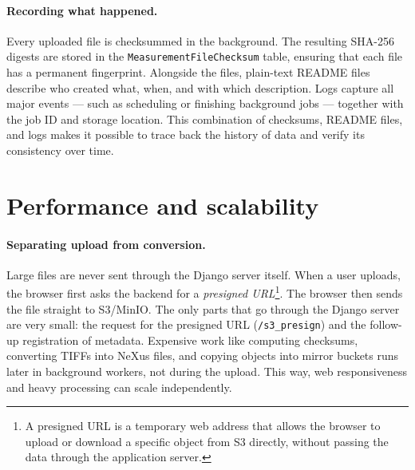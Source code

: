 \paragraph{Recording what happened.}
Every uploaded file is checksummed in the background.  
The resulting SHA-256 digests are stored in the 
\texttt{MeasurementFileChecksum} table, ensuring that each file has a 
permanent fingerprint.  
Alongside the files, plain-text README files describe who created what, when, 
and with which description.  
Logs capture all major events — such as scheduling or finishing background 
jobs — together with the job ID and storage location.  
This combination of checksums, README files, and logs makes it possible 
to trace back the history of data and verify its consistency over time.



\section{Performance and scalability}\label{sec:performance}

\paragraph{Separating upload from conversion.}
Large files are never sent through the Django server itself.  
When a user uploads, the browser first asks the backend for a \emph{presigned URL}\footnote{A presigned URL is a temporary web address that allows the browser to upload or download a specific object from S3 directly, without passing the data through the application server.}.  
The browser then sends the file straight to S3/MinIO.  
The only parts that go through the Django server are very small: the request for the presigned URL (\texttt{/s3\_presign}) and the follow-up registration of metadata.  
Expensive work like computing checksums, converting TIFFs into NeXus files, and copying objects into mirror buckets runs later in background workers, not during the upload.  
This way, web responsiveness and heavy processing can scale independently.

